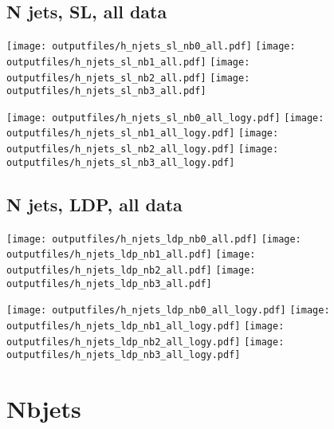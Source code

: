 \documentclass[11pt]{article}
\begin{document}
   \clearpage

    \subsection{ N jets, SL, all data}

    \noindent
     \texttt{[image: outputfiles/h\_njets\_sl\_nb0\_all.pdf]}
     \texttt{[image: outputfiles/h\_njets\_sl\_nb1\_all.pdf]}
     \texttt{[image: outputfiles/h\_njets\_sl\_nb2\_all.pdf]}
     \texttt{[image: outputfiles/h\_njets\_sl\_nb3\_all.pdf]}

    \noindent
     \texttt{[image: outputfiles/h\_njets\_sl\_nb0\_all\_logy.pdf]}
     \texttt{[image: outputfiles/h\_njets\_sl\_nb1\_all\_logy.pdf]}
     \texttt{[image: outputfiles/h\_njets\_sl\_nb2\_all\_logy.pdf]}
     \texttt{[image: outputfiles/h\_njets\_sl\_nb3\_all\_logy.pdf]}

   \clearpage

    \subsection{ N jets, LDP, all data}

    \noindent
     \texttt{[image: outputfiles/h\_njets\_ldp\_nb0\_all.pdf]}
     \texttt{[image: outputfiles/h\_njets\_ldp\_nb1\_all.pdf]}
     \texttt{[image: outputfiles/h\_njets\_ldp\_nb2\_all.pdf]}
     \texttt{[image: outputfiles/h\_njets\_ldp\_nb3\_all.pdf]}

    \noindent
     \texttt{[image: outputfiles/h\_njets\_ldp\_nb0\_all\_logy.pdf]}
     \texttt{[image: outputfiles/h\_njets\_ldp\_nb1\_all\_logy.pdf]}
     \texttt{[image: outputfiles/h\_njets\_ldp\_nb2\_all\_logy.pdf]}
     \texttt{[image: outputfiles/h\_njets\_ldp\_nb3\_all\_logy.pdf]}

   \clearpage




    \clearpage
    \section{Nbjets}
\end{document}
